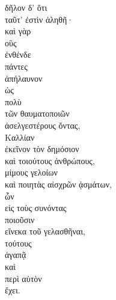 {\large
\begin{greek}
\noindent δῆλον δ' ὅτι \\
\tabto{2em} ταῦτ' ἐστὶν ἀληθῆ· \\
καὶ γὰρ \\
οὓς \\
\tabto{2em} ἐνθένδε \\
πάντες \\
ἀπήλαυνον \\
\tabto{2em} ὡς \\
\tabto{4em} πολὺ \\
\tabto{6em} τῶν θαυματοποιῶν \\
\tabto{4em} ἀσελγεστέρους ὄντας, \\
Καλλίαν \\
\tabto{2em} ἐκεῖνον τὸν δημόσιον \\
καὶ τοιούτους ἀνθρώπους, \\
\tabto{2em} μίμους γελοίων \\
\tabto{2em} καὶ ποιητὰς αἰσχρῶν ᾀσμάτων, \\
\tabto{4em} ὧν \\
\tabto{6em} εἰς τοὺς συνόντας \\
\tabto{4em} ποιοῦσιν \\
\tabto{6em} εἵνεκα τοῦ γελασθῆναι, \\
τούτους \\
ἀγαπᾷ \\
καὶ \\
\tabto{2em} περὶ αὑτὸν \\
ἔχει.\\

\end{greek}
}

